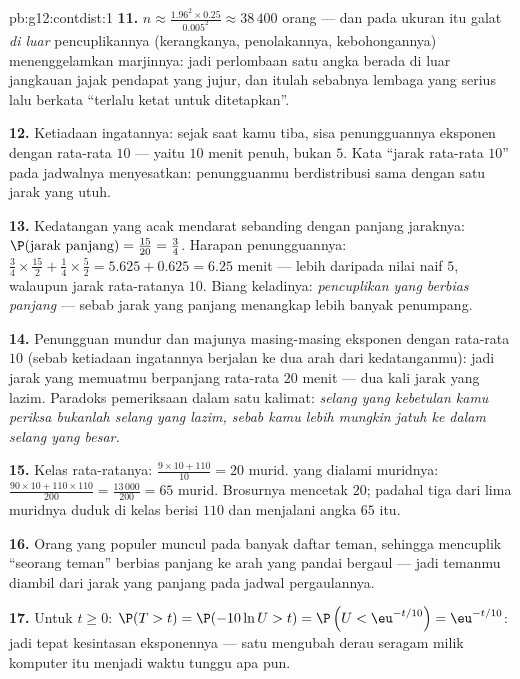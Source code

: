 \begin{solution}{pb:g12:contdist:1}
\textbf{11.} $n \approx \frac{1.96^2 \times 0.25}{0.005^2}
\approx 38\,400$ orang --- dan pada ukuran itu galat
\emph{di luar} pencuplikannya (kerangkanya, penolakannya, kebohongannya) menenggelamkan
marjinnya: jadi perlombaan satu angka berada di luar jangkauan jajak pendapat yang jujur, dan
itulah sebabnya lembaga yang serius lalu berkata ``terlalu ketat untuk ditetapkan''.

\textbf{12.} Ketiadaan ingatannya: sejak saat kamu tiba,
sisa penungguannya eksponen dengan rata-rata $10$ --- yaitu $10$
menit penuh, bukan $5$. Kata ``jarak rata-rata $10$'' pada jadwalnya
menyesatkan: penungguanmu berdistribusi sama dengan satu jarak yang utuh.

\textbf{13.} Kedatangan yang acak mendarat sebanding dengan panjang
jaraknya: $\P(\text{jarak panjang}) = \frac{15}{20} = \frac34$.
Harapan penungguannya: $\frac34 \times \frac{15}{2} + \frac14 \times
\frac52 = 5.625 + 0.625 = 6.25$ menit --- lebih daripada nilai naif
$5$, walaupun jarak rata-ratanya $10$. Biang keladinya: \emph{pencuplikan
yang berbias panjang} --- sebab jarak yang panjang menangkap lebih banyak penumpang.

\textbf{14.} Penungguan mundur dan majunya masing-masing eksponen
dengan rata-rata $10$ (sebab ketiadaan ingatannya berjalan ke dua arah dari
kedatanganmu): jadi jarak yang memuatmu berpanjang rata-rata $20$ menit
--- dua kali jarak yang lazim. Paradoks pemeriksaan dalam satu kalimat:
\emph{selang yang kebetulan kamu periksa bukanlah selang
yang lazim, sebab kamu lebih mungkin jatuh ke dalam selang yang
besar.}

\textbf{15.} Kelas rata-ratanya: $\frac{9 \times 10 + 110}{10} =
20$ murid.  yang dialami muridnya:
$\frac{90 \times 10 + 110 \times 110}{200} = \frac{13\,000}
{200} = 65$ murid. Brosurnya mencetak $20$; padahal tiga dari lima
muridnya duduk di kelas berisi $110$ dan menjalani angka $65$ itu.

\textbf{16.} Orang yang populer muncul pada banyak daftar teman, sehingga
mencuplik ``seorang teman'' berbias panjang ke arah yang pandai bergaul
--- jadi temanmu diambil dari jarak yang panjang pada jadwal
pergaulannya.

\textbf{17.} Untuk $t \geq 0$:
$\P(T > t) = \P(-10\ln U > t) = \P\left(U <
\eu^{-t/10}\right) = \eu^{-t/10}$: jadi tepat 
kesintasan eksponennya --- satu  mengubah derau
seragam milik komputer itu menjadi waktu tunggu apa pun.


\end{solution}
